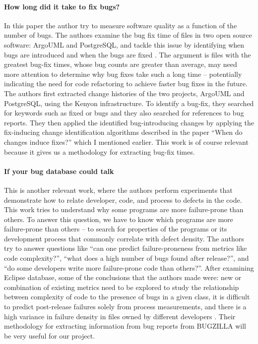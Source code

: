 \documentclass[preprint, 11pt]{sigplanconf}
\begin{document}
\paragraph{How long did it take to fix bugs?}
In this paper the author try to measure software quality as a function
of the number of bugs. The authors examine the bug fix time of files
in two open source software: ArgoUML and PostgreSQL, and tackle this
issue by identifying when bugs are introduced and when the bugs are
fixed \cite{2006-long}. The argument is files with the greatest
bug-fix times, whose bug counts are greater than average, may need
more attention to determine why bug fixes take such a long time –
potentially indicating the need for code refactoring to achieve faster
bug fixes in the future. The authors first extracted change histories
of the two projects, ArgoUML and PostgreSQL, using the Kenyon
infrastructure. To identify a bug-fix, they searched for keywords such
as fixed or bugs and they also searched for references to bug
reports. They then applied the identified bug-introducing changes by
applying the fix-inducing change identification algorithms described
in the paper “When do changes induce fixes?” which I mentioned
earlier.  This work is of course relevant because it gives us a
methodology for extracting bug-fix times.

\paragraph{If your bug database could talk}
This is another relevant work, where the authors perform experiments
that demonstrate how to relate developer, code, and process to defects
in the code. This work tries to understand why some programs are more
failure-prone than others.  To answer this question, we have to know
which programs are more failure-prone than others – to search for
properties of the programs or its development process that commonly
correlate with defect density. The authors try to answer questions
like “can one predict failure-proneness from metrics like code
complexity?”, “what does a high number of bugs found after release?”,
and “do some developers write more failure-prone code than
others?”. After examining Eclipse database, some of the conclusions
that the authors made were: new or combination of existing metrics
need to be explored to study the relationship between complexity of
code to the presence of bugs in a given class, it is difficult to
predict post-release failures solely from process measurements, and
there is a high variance in failure density in files owned by
different developers \cite{2006-if}. Their methodology for extracting
information from bug reports from BUGZILLA will be very useful for our
project.
\end{document}
